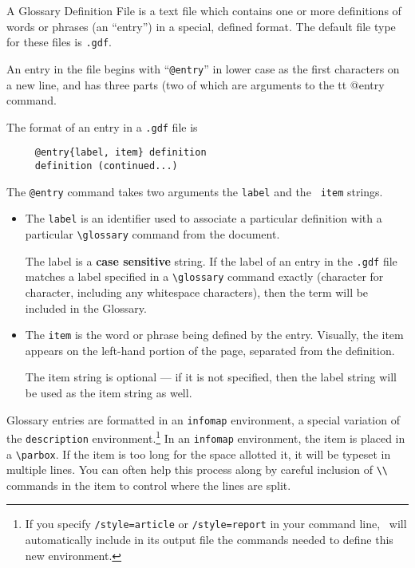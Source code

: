 A Glossary Definition File is a text file which contains one or more
definitions of words or phrases (an ``entry'') in a special, defined format. 
The default file type for these files is {\tt .gdf}. 

An entry in the file begins with ``{\tt @entry}'' in lower case as the first
characters on a new line, and has three parts (two of which are arguments to
the {tt @entry} command.

The format of an entry in a {\tt .gdf} file is
\begin{verbatim}
     @entry{label, item} definition
     definition (continued...)
\end{verbatim}

The {\tt @entry} command takes two arguments the {\tt label} and the {\tt
item}
strings.

\begin{itemize}
\item The {\tt label\/} is an identifier used to associate a particular
definition with a particular \verb+\glossary+ command from the document.  

The label is a {\bf case sensitive} string.  If the label of an entry in the
{\tt .gdf} file matches a label specified in a \verb+\glossary+ command exactly
(character for character, including any whitespace characters), then the
term will be included in the Glossary.

\item The {\tt item\/} is the word or phrase being defined by the entry.
Visually, the item appears on the left-hand portion of the page, separated from
the definition.

  The item string is optional --- if it is
not specified, then the label string will be used as the item string as well.
\end{itemize}

Glossary entries are formatted in an {\tt infomap} environment,  a special
variation of the {\tt description} environment.\footnote{If you specify
\verb+/style=article+ or \verb+/style=report+ in your command line, \GloTeX\ will
automatically include in its output file the commands needed to define this new
environment.}  In an {\tt infomap} environment, the item is placed in a
\verb+\parbox+.  If the item is too long for the space allotted it, it will be
typeset in multiple lines.  You can often help this process along by careful
inclusion of \verb+\\+ commands in the item to control where the lines are
split. 

